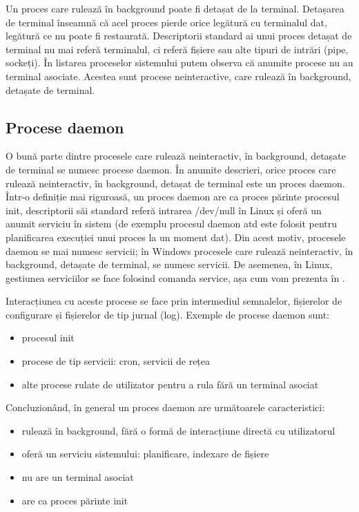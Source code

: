 Un proces care rulează în background poate fi detașat de la terminal. Detașarea
de terminal înseamnă că acel proces pierde orice legătură cu terminalul dat,
legătură ce nu poate fi restaurată. Descriptorii standard ai unui proces detașat
de terminal nu mai referă terminalul, ci referă fișiere sau alte tipuri de
intrări (pipe, sockeți). În listarea proceselor sistemului putem observa că
anumite procese nu au terminal asociate. Acestea sunt procese neinteractive,
care rulează în background, detașate de terminal.

\subsection{Procese daemon}
\label{sec:procese-interactivitate-daemon}

O bună parte dintre procesele care rulează neinteractiv, în background, detașate
de terminal se numesc procese daemon. În anumite descrieri, orice proces care
rulează neinteractiv, în background, detașat de terminal este un proces daemon.
Într-o definiție mai riguroasă, un proces daemon are ca proces părinte procesul
init, descriptorii săi standard referă intrarea /dev/null în Linux și oferă un
anumit serviciu în sistem (de exemplu procesul daemon atd este folosit pentru
planificarea execuției unui proces la un moment dat). Din acest motiv, procesele
daemon se mai numesc servicii; în Windows procesele care rulează neinteractiv,
în background, detașate de terminal, se numesc servicii. De asemenea, în Linux,
gestiunea serviciilor se face folosind comanda service, așa cum vom prezenta în
.

Interacțiunea cu aceste procese se face prin intermediul semnalelor, fișierelor
de configurare și fișierelor de tip jurnal (log). Exemple de procese daemon
sunt:

\begin{itemize}
	\item procesul init
	\item procese de tip servicii: cron, servicii de rețea
	\item alte procese rulate de utilizator pentru a rula fără un terminal asociat
\end{itemize}

Concluzionând, în general un proces daemon are următoarele caracteristici:

\begin{itemize}
	\item rulează în background, fără o formă de interacțiune directă cu utilizatorul
	\item oferă un serviciu sistemului: planificare, indexare de fișiere
	\item nu are un terminal asociat
	\item are ca proces părinte init
\end{itemize}

